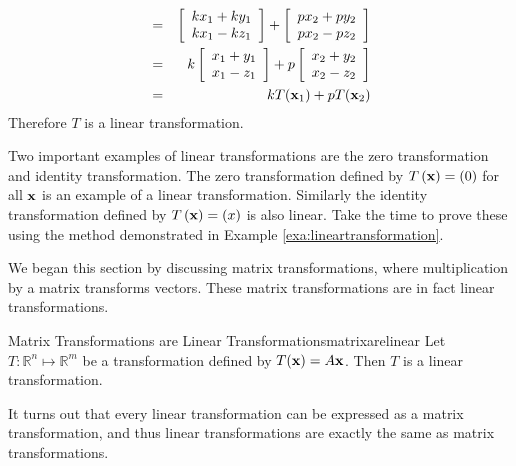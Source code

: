 \begin{solution}
\begin{eqnarray*}
&=& \left[\begin{array}{c} kx_1 + ky_1 \\ kx_1 - kz_1 \end{array}\right] + \left[ \begin{array}{c} px_2 + py_2 \\  px_2 - pz_2 \end{array}\right] \\
&=& k \left[\begin{array}{c} x_1 + y_1 \\ x_1 - z_1 \end{array}\right] + p \left[ \begin{array}{c} x_2 + y_2 \\  x_2 - z_2 \end{array}\right] \\
&=& k T({\bf x}_1) + p T({\bf x}_2) 
\end{eqnarray*}
Therefore $T$ is a linear transformation. 
\end{solution}

Two important examples of linear transformations are the zero transformation and identity transformation. The zero transformation defined by $T\left( {\bf x} \right) = {\bf (}0)$ for all ${\bf x}$ is an example of a linear transformation. Similarly the identity transformation defined by $T\left( {\bf x} \right) = {\bf (}x)$ is also linear. Take the time to prove these using the method demonstrated in Example \ref{exa:lineartransformation}.

We began this section by discussing matrix transformations, where multiplication by a matrix transforms vectors. These matrix transformations are in fact linear transformations. 

\begin{theorem}{Matrix Transformations are Linear Transformations}{matrixarelinear}
Let $T:\mathbb{R}^{n}\mapsto \mathbb{R}^{m}$ be a transformation defined by $T({\bf x}) = A{\bf x}$. Then $T$ is a linear transformation. 
\end{theorem}

It turns out that every linear transformation can be expressed as a matrix transformation, and thus linear transformations are exactly the same as matrix transformations. 
